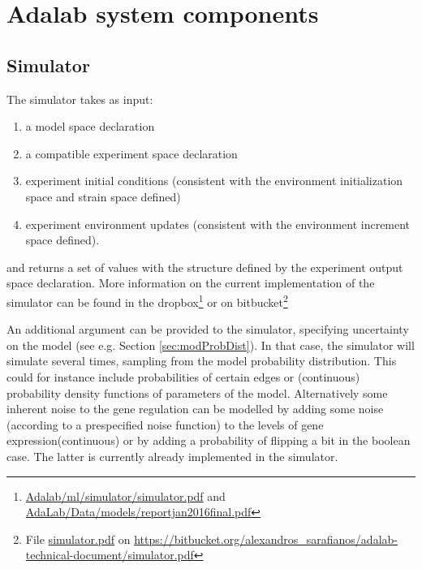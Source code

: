 \documentclass{article}
\begin{document}
\section{Adalab system components}

\subsection{Simulator}
The simulator takes as input:
\begin{enumerate}
\item a model space declaration
\item a compatible experiment space declaration
\item experiment initial conditions (consistent with the environment initialization space and strain space defined)
\item experiment environment updates (consistent with the environment increment space defined).
\end{enumerate}

and returns a set of values with the structure defined by the experiment output space declaration.
More information on the current implementation of the simulator can be found in the dropbox\footnote{\url{Adalab/ml/simulator/simulator.pdf} 
and \url{AdaLab/Data/models/reportjan2016final.pdf}} or on bitbucket\footnote{File \url{simulator.pdf} on \url{https://bitbucket.org/alexandros_sarafianos/adalab-technical-document/simulator.pdf}}

An additional argument can be provided to the simulator, specifying uncertainty on the model (see e.g. Section \ref{sec:modProbDist}).  In that case, the simulator will simulate several times, sampling from the model probability distribution.  
This could for instance include probabilities of certain edges or (continuous) probability density functions of parameters of the model. Alternatively some inherent noise to the gene regulation can be modelled by adding some noise (according to a prespecified
noise function) to the levels of gene expression(continuous) or by adding a probability of flipping a bit in the boolean case. The latter is currently already implemented in the simulator.
\end{document}
